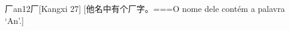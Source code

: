 \begin{EntryWithPhonetic}{厂}{an1}{2}{⼚}[Kangxi 27]
  [他名中有个厂字。===O nome dele contém a palavra `An'.]
\end{EntryWithPhonetic}
